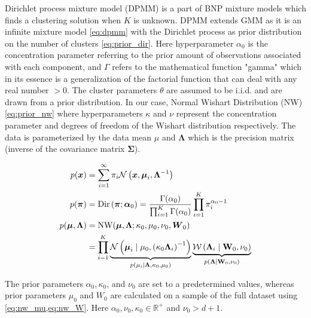 \begin{secDefinition} \label{sec:dpmm}
Dirichlet process mixture model (DPMM) is a part of BNP mixture models which finds a clustering solution when $K$ is unknown. 
DPMM extends GMM as it is an infinite mixture model \cref{eq:dpmm} with the Dirichlet process as prior distribution on the number of clusters \cref{eq:prior_dir}. 
Here hyperparameter $\alpha_0$ is the concentration parameter referring to the prior amount of observations associated with each component, and $\Gamma$ refers to the mathematical function "gamma" which in its essence is a generalization of the factorial function that can deal with any real number $>0$.
The cluster parameters $\theta$ are assumed to be i.i.d. and are drawn from a prior distribution. 
In our case, Normal Wishart Distribution (NW) \cref{eq:prior_nw} where hyperparameters $\kappa$ and $\nu$ represent the concentration parameter and degrees of freedom of the Wishart distribution respectively. 
The data is parameterized by the data mean $\mu$ and $\boldsymbol{\Lambda}$ which is the precision matrix (inverse of the covariance matrix $\boldsymbol{\Sigma}$).

\begin{align}
p(\boldsymbol{x}) &=\sum_{i=1}^{\infty} \pi_{i} \mathcal{N}\left(\boldsymbol{x}, \boldsymbol{\mu}_{i}, \boldsymbol{\Lambda}^{-1}\right) \label{eq:dpmm} \\
p(\boldsymbol{\pi}) &= \operatorname{Dir}\left(\boldsymbol{\pi}; \boldsymbol{\alpha}_{0}\right) = \frac{\Gamma(\alpha_0)}{\prod_{i=1}^{K} \Gamma(\alpha_0) } \prod_{i=1}^{K} \pi_{i}^{\alpha_{0}-1} \label{eq:prior_dir} \\
p(\boldsymbol{\mu}, \boldsymbol{\Lambda}) &= \operatorname{NW}(\boldsymbol{\mu}, \boldsymbol{\Lambda}; \kappa_0, \mu_0, \nu_0, \boldsymbol{W}_0) \notag\\
&= \prod_{i=1}^{K} 
\underbrace{\mathcal{N}\left(\boldsymbol{\mu}_{i} \mid \mu_{0},\left(\kappa_{0} \boldsymbol{\Lambda}_{i}\right)^{-1}\right)}_{p(\mu_i | \boldsymbol{\Lambda}, \kappa_0, \mu_0)}
\underbrace{\mathcal{W}\left(\boldsymbol{\Lambda}_{i} \mid \mathbf{W}_{0}, \nu_{0}\right)}_{p(\boldsymbol{\Lambda}|\mathbf{W}_0, \nu_0)}
\label{eq:prior_nw}
\end{align}

The prior parameters $\alpha_0, \kappa_0$, and $\nu_0$ are set to a predetermined values, whereas prior parameters $\mu_0$ and $W_0$ are calculated on a sample of the full dataset using \cref{eq:nw_mu,eq:nw_W}. Here $\alpha_0, \nu_0,  \kappa_0 \in \mathbb{R}^+$ and $\nu_0 > d + 1$.


\end{secDefinition}
